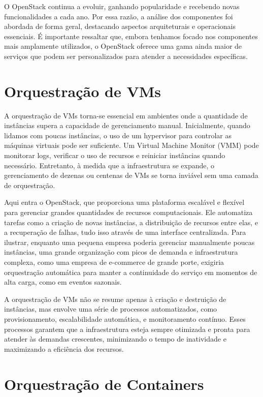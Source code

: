 O OpenStack continua a evoluir, ganhando popularidade e recebendo novas funcionalidades a cada ano. Por essa razão, a análise dos componentes foi abordada de forma geral, destacando aspectos arquiteturais e operacionais essenciais. É importante ressaltar que, embora tenhamos focado nos componentes mais amplamente utilizados, o OpenStack oferece uma gama ainda maior de serviços que podem ser personalizados para atender a necessidades específicas.


\section{Orquestração de VMs}

A orquestração de VMs torna-se essencial em ambientes onde a quantidade de instâncias supera a capacidade de gerenciamento manual. Inicialmente, quando lidamos com poucas instâncias, o uso de um hypervisor para controlar as máquinas virtuais pode ser suficiente. Um Virtual Machine Monitor (VMM) pode monitorar logs, verificar o uso de recursos e reiniciar instâncias quando necessário. Entretanto, à medida que a infraestrutura se expande, o gerenciamento de dezenas ou centenas de VMs se torna inviável sem uma camada de orquestração.

Aqui entra o OpenStack, que proporciona uma plataforma escalável e flexível para gerenciar grandes quantidades de recursos computacionais. Ele automatiza tarefas como a criação de novas instâncias, a distribuição de recursos entre elas, e a recuperação de falhas, tudo isso através de uma interface centralizada. Para ilustrar, enquanto uma pequena empresa poderia gerenciar manualmente poucas instâncias, uma grande organização com picos de demanda e infraestrutura complexa, como uma empresa de e-commerce de grande porte, exigiria orquestração automática para manter a continuidade do serviço em momentos de alta carga, como em eventos sazonais.

A orquestração de VMs não se resume apenas à criação e destruição de instâncias, mas envolve uma série de processos automatizados, como provisionamento, escalabilidade automática, e monitoramento contínuo. Esses processos garantem que a infraestrutura esteja sempre otimizada e pronta para atender às demandas crescentes, minimizando o tempo de inatividade e maximizando a eficiência dos recursos.

\section{Orquestração de Containers}

